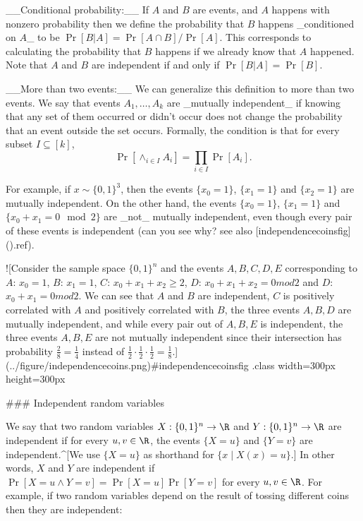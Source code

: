 __Conditional probability:__ If $A$ and $B$ are events, and $A$ happens with nonzero probability then we define the probability that $B$ happens _conditioned on $A$_ to be $\Pr[B|A] = \Pr[A \cap B]/\Pr[A]$.
This corresponds to calculating the probability that $B$ happens if we already know that $A$ happened.
Note that $A$ and $B$ are independent if and only if $\Pr[B|A]=\Pr[B]$.

__More than two events:__ We can generalize this definition to more than two events.
We say that events $A_1,\ldots,A_k$ are _mutually independent_ if knowing that any set of them occurred or didn't occur does not change the probability that an event outside the set occurs.
Formally, the condition is that for every subset $I \subseteq [k]$,
$$
\Pr[ \wedge_{i\in I} A_i] =\prod_{i\in I} \Pr[A_i].
$$

For example, if $x\sim \{0,1\}^3$, then the events $\{ x_0=1 \}$, $\{ x_1 = 1\}$ and $\{x_2 = 1 \}$ are mutually independent.
On the other hand, the events $\{x_0 = 1 \}$, $\{x_1 = 1\}$ and $\{ x_0 + x_1 = 0 \mod 2 \}$ are _not_ mutually independent, even though every pair of these events is independent (can you see why? see also [independencecoinsfig](){.ref}).


![Consider the sample space $\{0,1\}^n$ and the events $A,B,C,D,E$ corresponding to $A$: $x_0=1$, $B$: $x_1=1$, $C$: $x_0+x_1+x_2 \geq 2$, $D$: $x_0+x_1+x_2 = 0 mod 2$ and $D$: $x_0+x_1 = 0 mod 2$. We can see that $A$ and $B$ are independent, $C$ is positively correlated with $A$ and positively correlated with $B$, the three events $A,B,D$ are mutually independent, and while every pair out of $A,B,E$ is independent, the three events $A,B,E$ are not mutually independent since their intersection has probability $\tfrac{2}{8}=\tfrac{1}{4}$ instead of $\tfrac{1}{2}\cdot \tfrac{1}{2} \cdot \tfrac{1}{2} = \tfrac{1}{8}$.](../figure/independencecoins.png){#independencecoinsfig .class width=300px height=300px}

### Independent random variables

We say that two random variables $X:\{0,1\}^n \rightarrow \R$ and $Y:\{0,1\}^n \rightarrow \R$ are independent if for every $u,v \in \R$, the events $\{ X=u \}$ and $\{ Y=v \}$ are independent.^[We use $\{ X=u \}$ as shorthand for $\{ x \;|\; X(x)=u \}$.]
In other words, $X$ and $Y$ are independent if $\Pr[ X=u \wedge Y=v]=\Pr[X=u]\Pr[Y=v]$ for every $u,v \in \R$.
For example, if two random variables depend on the result of tossing different coins then they are independent:

